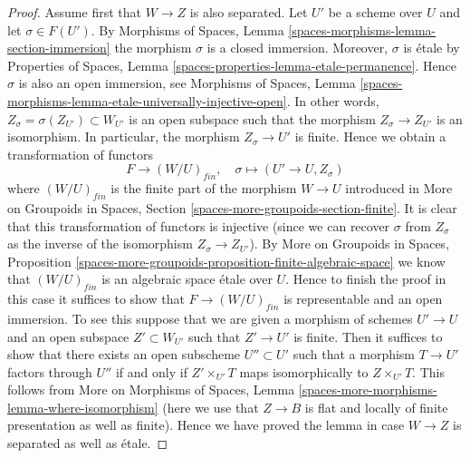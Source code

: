 \begin{proof}
Assume first that $W \to Z$ is also separated.
Let $U'$ be a scheme over $U$ and let $\sigma \in F(U')$. By
Morphisms of Spaces, Lemma \ref{spaces-morphisms-lemma-section-immersion}
the morphism $\sigma$ is a closed immersion.
Moreover, $\sigma$ is \'etale by
Properties of Spaces, Lemma \ref{spaces-properties-lemma-etale-permanence}.
Hence $\sigma$ is also an open immersion, see
Morphisms of Spaces,
Lemma \ref{spaces-morphisms-lemma-etale-universally-injective-open}.
In other words, $Z_\sigma = \sigma(Z_{U'}) \subset W_{U'}$ is
an open subspace such that the morphism $Z_\sigma \to Z_{U'}$
is an isomorphism. In particular, the morphism $Z_\sigma \to U'$
is finite. Hence we obtain a transformation of functors
$$
F \longrightarrow (W/U)_{fin}, \quad
\sigma \longmapsto (U' \to U, Z_\sigma)
$$
where $(W/U)_{fin}$ is the finite part of the morphism $W \to U$
introduced in
More on Groupoids in Spaces, Section
\ref{spaces-more-groupoids-section-finite}.
It is clear that this transformation of functors is injective (since we can
recover $\sigma$ from $Z_\sigma$ as the inverse of the isomorphism
$Z_\sigma \to Z_{U'}$). By
More on Groupoids in Spaces, Proposition
\ref{spaces-more-groupoids-proposition-finite-algebraic-space}
we know that $(W/U)_{fin}$ is an algebraic space \'etale over $U$.
Hence to finish the proof in this case it suffices to show that
$F \to (W/U)_{fin}$ is representable and an open immersion.
To see this suppose that we are given a morphism of schemes $U' \to U$
and an open subspace $Z' \subset W_{U'}$ such that $Z' \to U'$
is finite. Then it suffices to show that there exists an
open subscheme $U'' \subset U'$ such that a morphism
$T \to U'$ factors through $U''$ if and only if $Z' \times_{U'} T$
maps isomorphically to $Z \times_{U'} T$. This follows from
More on Morphisms of Spaces, Lemma
\ref{spaces-more-morphisms-lemma-where-isomorphism}
(here we use that $Z \to B$ is flat and locally of finite presentation
as well as finite).
Hence we have proved the lemma in case $W \to Z$ is separated
as well as \'etale.


\end{proof}
